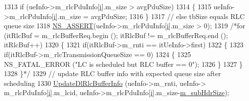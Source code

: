 \begin{DoxyCode}
1313                                 \textcolor{keywordflow}{if} (ueInfo->m\_rlcPduInfo[\hyperlink{bernuolliDistribution_8m_a6f6ccfcf58b31cb6412107d9d5281426}{i}].m\_size > avgPduSize)
1314                                 \{
1315                                         ueInfo->m\_rlcPduInfo[\hyperlink{bernuolliDistribution_8m_a6f6ccfcf58b31cb6412107d9d5281426}{i}].m\_size = avgPduSize;
1316                                 \}
1317                                 \textcolor{comment}{// else tbSize equals RLC queue size}
1318                                 \hyperlink{assert_8h_a6dccdb0de9b252f60088ce281c49d052}{NS\_ASSERT}(ueInfo->m\_rlcPduInfo[\hyperlink{bernuolliDistribution_8m_a6f6ccfcf58b31cb6412107d9d5281426}{i}].m\_size > 0);
1319                                 \textcolor{comment}{/*for (itRlcBuf = m\_rlcBufferReq.begin (); itRlcBuf != m\_rlcBufferReq.end
       (); itRlcBuf++)}
1320 \textcolor{comment}{                                                                \{}
1321 \textcolor{comment}{                                                                        if(itRlcBuf->m\_rnti ==
       itUeInfo->first)}
1322 \textcolor{comment}{                                                                        \{}
1323 \textcolor{comment}{                                                                                
      if(itRlcBuf->m\_rlcTransmissionQueueSize == 0)}
1324 \textcolor{comment}{                                                                                \{}
1325 \textcolor{comment}{                                                                                        NS\_FATAL\_ERROR ("LC
       is scheduled but RLC buffer == 0");}
1326 \textcolor{comment}{                                                                                \}}
1327 \textcolor{comment}{                                                                        \}}
1328 \textcolor{comment}{                                                                \}*/}
1329                                 \textcolor{comment}{// update RLC buffer info with expected queue size after scheduling}
1330                                 \hyperlink{classns3_1_1MmWaveFlexTtiPfMacScheduler_a7656880279e340e496567b69fdf3c0e9}{UpdateDlRlcBufferInfo} (ueInfo->m\_rnti, ueInfo->
      m\_rlcPduInfo[\hyperlink{bernuolliDistribution_8m_a6f6ccfcf58b31cb6412107d9d5281426}{i}].m\_lcid, ueInfo->m\_rlcPduInfo[\hyperlink{bernuolliDistribution_8m_a6f6ccfcf58b31cb6412107d9d5281426}{i}].m\_size-\hyperlink{classns3_1_1MmWaveFlexTtiPfMacScheduler_a1087fd886396487dcacf4282b051e044}{m\_subHdrSize});

\end{DoxyCode}
